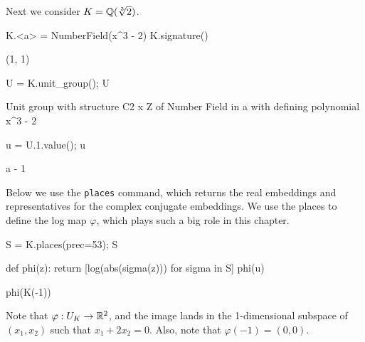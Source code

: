 Next we consider $K=\mathbb{Q}(\sqrt[3]{2})$.
\begin{sagecode}
\begin{sagecell}
K.<a> = NumberField(x^3 - 2)
K.signature()
\end{sagecell}
\begin{sageout}
(1, 1)
\end{sageout}
\begin{sagecell}
U = K.unit_group(); U
\end{sagecell}
\begin{sageout}
Unit group with structure C2 x Z of Number Field in a with
defining polynomial x^3 - 2
\end{sageout}
\begin{sagecell}
\end{sagecell}
\begin{sageout}
[-1, a - 1]
\end{sageout}
\begin{sagecell}
u = U.1.value(); u
\end{sagecell}
\begin{sageout}
a - 1
\end{sageout}
\end{sagecode} %

Below we use the {\tt places} command, which returns the real embeddings
and representatives for the complex conjugate embeddings.
We use the places to define the log map $\varphi$, which plays such a big
role in this chapter.
\begin{sagecode} %
\begin{sagecell}
S = K.places(prec=53); S
\end{sagecell}
\begin{sageout}
\end{sageout}
\begin{sagecell}
def phi(z):
    return [log(abs(sigma(z))) for sigma in S]
phi(u)
\end{sagecell}
\begin{sageout}
[-1.3473773483293832, 0.673688674164692]
\end{sageout}
\begin{sagecell}
phi(K(-1))
\end{sagecell}
\begin{sageout}
[0.0, 0.0]
\end{sageout}
\end{sagecode}
Note that $\varphi:U_K \to \mathbb{R}^2$, and the image lands in the 1-dimensional
subspace of $(x_1,x_2)$ such that $x_1 +2x_2 = 0$.
Also, note that $\varphi(-1)=(0,0)$.

